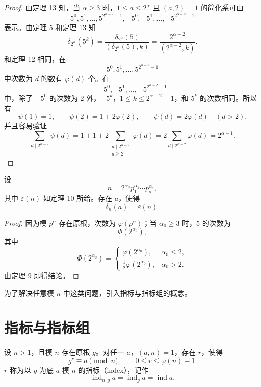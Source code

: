 \begin{proof}
	由定理 13 知，当 $\alpha\geq 3$ 时，$1\leq a\leq 2^\alpha$ 且 $(a,2)=1$ 的简化系可由
	\[
		5^0,5^1,\ldots,5^{2^{\alpha-2}-1},
		-5^0,-5^1,\ldots,-5^{2^{\alpha-2}-1}
	\]
	表示。由定理 5 和定理 13 知
	\[
		\delta_{2^\alpha}(5^k)
		=
		\frac{\delta_{2^\alpha}(5)}{(\delta_{2^\alpha}(5),k)}
		=
		\frac{2^{\alpha-2}}{(2^{\alpha-2},k)}.
	\]
	和定理 12 相同，在
	\[
		5^0,5^1,\ldots,5^{2^{\alpha-2}-1}
	\]
	中次数为 $d$ 的数有 $\varphi(d)$ 个。在
	\[
		-5^0,-5^1,\ldots,-5^{2^{\alpha-2}-1}
	\]
	中，除了 $-5^0$ 的次数为 $2$ 外，$-5^k$，$1\leq k\leq 2^{\alpha-2}-1$，和 $5^k$ 的次数相同。所以有
	\[
		\psi(1)=1,\qquad
		\psi(2)=1+2\varphi(2),\qquad
		\psi(d)=2\varphi(d)\quad (d>2).
	\]
	并且容易验证
	\[
		\sum_{d\mid 2^{\alpha-2}}\psi(d)
		=
		1+1+2\sum_{\substack{d\mid 2^{\alpha-2}\\ d\geq 2}}\varphi(d)
		=
		2\sum_{d\mid 2^{\alpha-2}}\varphi(d)
		=
		2^{\alpha-1}.
	\]
\end{proof}

\begin{theorem}[原文 定理 15]
	设
	\[
		n=2^{\alpha_0}p_1^{\alpha_1}\cdots p_s^{\alpha_s},
	\]
	其中 $\varepsilon(n)$ 如定理 10 所给。存在 $a$，使得
	\[
		\delta_n(a)=\varepsilon(n).
	\]
\end{theorem}

\begin{proof}
	因为模 $p^\alpha$ 存在原根，次数为 $\varphi(p^\alpha)$；当 $\alpha_0\geq 3$ 时，$5$ 的次数为
	\[
		\Phi(2^{\alpha_0}),
	\]
	其中
	\[
		\Phi(2^{\alpha_0})
		=
		\begin{cases}
			\varphi(2^{\alpha_0}), & \alpha_0\leq 2,\\
			\frac12\varphi(2^{\alpha_0}), & \alpha_0>2.
		\end{cases}
	\]
	由定理 9 即得结论。
\end{proof}

为了解决任意模 $n$ 中这类问题，引入指标与指标组的概念。

\section{指标与指标组}

\begin{definition}[原文 定义 3]
	设 $n>1$，且模 $n$ 存在原根 $g$。对任一 $a$，$(a,n)=1$，存在 $r$，使得
	\[
		g^r\equiv a\pmod n,
		\qquad
		0\leq r\leq \varphi(n)-1.
	\]
	$r$ 称为以 $g$ 为底 $a$ 模 $n$ 的指标（index），记作
	\[
		\operatorname{ind}_{n,g}a
		=
		\operatorname{ind}_g a
		=
		\operatorname{ind} a.
	\]
\end{definition}

